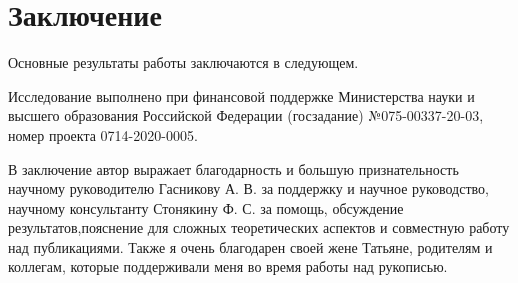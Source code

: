\chapter*{Заключение}                       %


Основные результаты работы заключаются в следующем.


Исследование выполнено при финансовой поддержке Министерства науки
и высшего образования Российской Федерации (госзадание) №075-00337-20-03,
номер проекта 0714-2020-0005.

В заключение автор выражает благодарность и большую признательность научному руководителю Гасникову А. В. за поддержку и научное руководство, научному консультанту Стонякину Ф. С. за помощь, обсуждение результатов,пояснение для сложных теоретических аспектов и совместную работу над публикациями. Также я очень благодарен своей жене Татьяне, родителям и коллегам, которые поддерживали меня во время работы над рукописью. 
